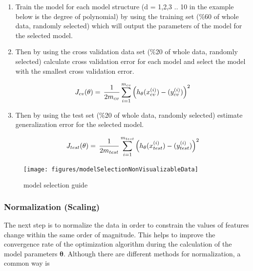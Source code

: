 \begin{enumerate}
  \item Train the model for each model structure (d = 1,2,3 .. 10 in the example below is the degree of polynomial) by using the training set (\%60 of whole data, randomly selected) which will output the parameters of the model for the selected model.
  \item Then by using the cross validation data set (\%20 of whole data, randomly selected) calculate cross validation error for each model and select the model with the smallest cross validation error.

\begin{equation}{\label{eqn:costFuncCrossVal}}
J_{cv}(\theta)
=\,
\frac{1}{2m_{cv}} \sum\limits_{i=1}^{m_{cv}} \Big(h_\theta(x_{cv}^{(i)}) - (y_{cv}^{(i)})\Big)^2  
\end{equation} 

  \item Then by using the test set (\%20 of whole data, randomly selected) estimate generalization error for the selected model.
  
\begin{equation}{\label{eqn:costFuncTest}}
J_{test}(\theta)
=\,
\frac{1}{2m_{test}} \sum\limits_{i=1}^{m_{test}} \Big(h_\theta(x_{test}^{(i)}) - (y_{test}^{(i)})\Big)^2  
\end{equation} 

\end{enumerate}

\begin{landscape}
\begin{figure}
\begin{center}
\texttt{[image: figures/modelSelectionNonVisualizableData]}    %
\caption{model selection guide} 
\label{fig:modelSelection}
\end{center}
\end{figure}
\end{landscape}

\subsubsection{Normalization (Scaling)}

The next step is to normalize the data in order to constrain the values of features change within the same order of magnitude. 
This helps to improve the convergence rate of the optimization algorithm during the calculation of the model parameters $\bm{\theta}$.  
Although there are different methods for normalization, a common way is

